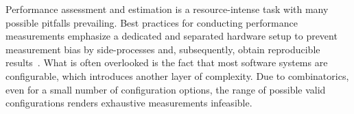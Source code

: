 \documentclass[sigconf, screen]{acmart}
\begin{document}
	Performance assessment and estimation is a resource-intense task with many possible pitfalls prevailing.
	Best practices for conducting performance measurements emphasize a dedicated and separated hardware setup to prevent measurement bias by side-processes and, subsequently, obtain reproducible results~\cite{molyneauxArtApplicationPerformance2015}.	%
	What is often overlooked is the fact that most software systems are configurable, which introduces another layer of complexity.
	Due to combinatorics, even for a small number of configuration options, the range of possible valid configurations renders exhaustive measurements infeasible.
	
	
\end{document}
